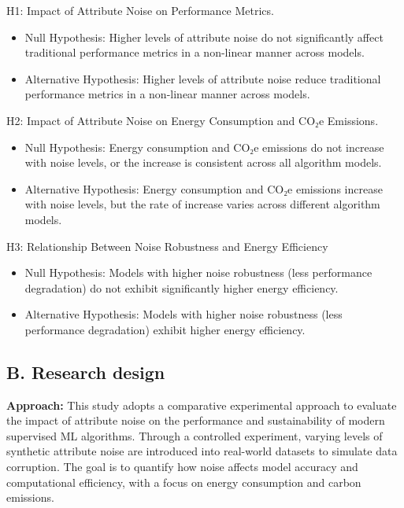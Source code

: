 \documentclass[conference]{IEEEtran}
\begin{document}
\newline
\newline
\begin{itemize}[noitemsep, leftmargin=*]
    H1: Impact of Attribute Noise on Performance Metrics.
    \begin{itemize}[noitemsep, leftmargin=*]

    \item Null Hypothesis: Higher levels of attribute noise do not significantly affect traditional performance metrics in a non-linear manner across models.
    \item Alternative Hypothesis: Higher levels of attribute noise reduce traditional performance metrics in a non-linear manner across models.
    
    \end{itemize}

    H2: Impact of Attribute Noise on Energy Consumption and CO₂e Emissions.
    \begin{itemize}[noitemsep, leftmargin=*]

    \item Null Hypothesis: Energy consumption and CO₂e emissions do not increase with noise levels, or the increase is consistent across all algorithm models.
    \item Alternative Hypothesis: Energy consumption and CO₂e emissions increase with noise levels, but the rate of increase varies across different algorithm models.
    
    \end{itemize}

    H3: Relationship Between Noise Robustness and Energy Efficiency
    \begin{itemize}[noitemsep, leftmargin=*]
    \item Null Hypothesis: Models with higher noise robustness (less performance degradation) do not exhibit significantly higher energy efficiency.
    \item Alternative Hypothesis: Models with higher noise robustness (less performance degradation) exhibit higher energy efficiency.
    \end{itemize}
\end{itemize}

\subsection*{B. Research design}

\textbf{Approach:} This study adopts a comparative experimental approach to evaluate the impact of attribute noise on the performance and sustainability of modern supervised ML algorithms. Through a controlled experiment, varying levels of synthetic attribute noise are introduced into real-world datasets to simulate data corruption. The goal is to quantify how noise affects model accuracy and computational efficiency, with a focus on energy consumption and carbon emissions.
\newline
\end{document}
